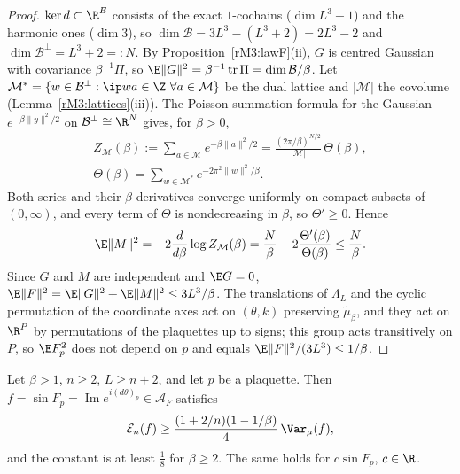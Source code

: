 \begin{proof}
$\ker d\subset\R^E$ consists of the exact $1$-cochains ($\dim L^3-1$) and
the harmonic ones ($\dim3$), so $\dim\mathcal B=3L^3-(L^3+2)=2L^3-2$ and
$\dim\mathcal B^\perp=L^3+2=:N$. By Proposition~\ref{rM3:lawF}(ii), $G$ is
centred Gaussian with covariance $\beta^{-1}\Pi$, so $\E\lVert G\rVert^2=
\beta^{-1}\operatorname{tr}\Pi=\dim\mathcal B/\beta$. Let $\mathcal M^*=\{w
\in\mathcal B^\perp:\ip wa\in\Z\ \forall a\in\mathcal M\}$ be the dual lattice
and $\lvert\mathcal M\rvert$ the covolume (Lemma~\ref{rM3:lattices}(iii)).
The Poisson summation formula for the Gaussian $e^{-\beta\lVert y\rVert^2/2}$
on $\mathcal B^\perp\cong\R^N$ gives, for $\beta>0$,
\begin{gather*}
Z_{\mathcal M}(\beta):=\sum_{a\in\mathcal M}e^{-\beta\lVert a\rVert^2/2}=
\frac{(2\pi/\beta)^{N/2}}{\lvert\mathcal M\rvert}\,\Theta(\beta),\\
\Theta(\beta)=\sum_{w\in\mathcal M^*}e^{-2\pi^2\lVert w\rVert^2/\beta}.
\end{gather*}
Both series and their $\beta$-derivatives converge uniformly on compact
subsets of $(0,\infty)$, and every term of $\Theta$ is nondecreasing in
$\beta$, so $\Theta'\ge0$. Hence
\[
\E\lVert M\rVert^2=-2\frac{d}{d\beta}\log Z_{\mathcal M}(\beta)=\frac N\beta
-2\frac{\Theta'(\beta)}{\Theta(\beta)}\le\frac N\beta .
\]
Since $G$ and $M$ are independent and $\E G=0$, $\E\lVert F\rVert^2=
\E\lVert G\rVert^2+\E\lVert M\rVert^2\le3L^3/\beta$. The translations of
$\Lambda_L$ and the cyclic permutation of the coordinate axes act on
$(\theta,k)$ preserving $\tilde\mu_\beta$, and they act on $\R^P$ by
permutations of the plaquettes up to signs; this group acts transitively on
$P$, so $\E F_p^2$ does not depend on $p$ and equals $\E\lVert F\rVert^2/
(3L^3)\le1/\beta$.
\end{proof}

\begin{proposition}\label{rM3:plaq}
Let $\beta>1$, $n\ge2$, $L\ge n+2$, and let $p$ be a plaquette. Then
$f=\sin F_p=\operatorname{Im}e^{i(d\theta)_p}\in\mathcal A_F$ satisfies
\[
\mathcal E_n(f)\ge\frac{(1+2/n)(1-1/\beta)}4\,\Var_\mu(f),
\]
and the constant is at least $\frac18$ for $\beta\ge2$. The same holds for
$c\sin F_p$, $c\in\R$.
\end{proposition}

